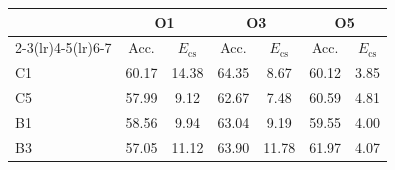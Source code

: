 \begin{tabular}{@{}lcccccc@{}}
\toprule
 & \multicolumn{2}{c}{O1} & \multicolumn{2}{c}{O3} & \multicolumn{2}{c}{O5} \\
\cmidrule(lr){2-3}\cmidrule(lr){4-5}\cmidrule(lr){6-7}
 & Acc. & $E_{\mathrm{cs}}$ & Acc. & $E_{\mathrm{cs}}$ & Acc. & $E_{\mathrm{cs}}$ \\
\midrule
C1 & 60.17 & 14.38 & 64.35 & 8.67 & 60.12 & 3.85 \\
C5 & 57.99 & 9.12 & 62.67 & 7.48 & 60.59 & 4.81 \\
B1 & 58.56 & 9.94 & 63.04 & 9.19 & 59.55 & 4.00 \\
B3 & 57.05 & 11.12 & 63.90 & 11.78 & 61.97 & 4.07 \\
\bottomrule
\end{tabular}
